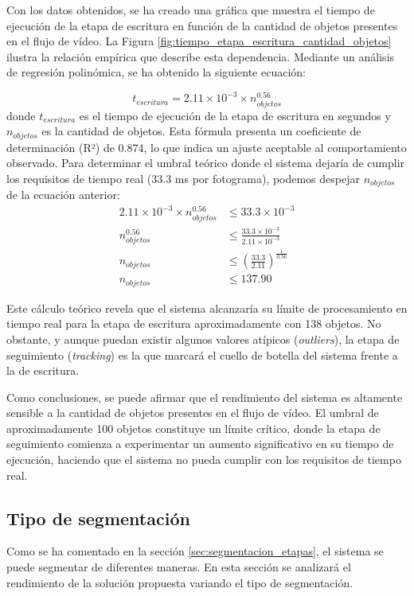 \documentclass[11pt,spanish,listoffigures,listoftables]{tfgetsinf}
\begin{document}
Con los datos obtenidos, se ha creado una gráfica que muestra el tiempo de ejecución de la etapa de escritura en función de la cantidad de objetos presentes en el flujo de vídeo. La Figura \ref{fig:tiempo_etapa_escritura_cantidad_objetos} ilustra la relación empírica que describe esta dependencia. Mediante un análisis de regresión polinómica, se ha obtenido la siguiente ecuación:

\begin{equation}
   t_{escritura} = 2.11 \times 10^{-3} \times n_{objetos}^{0.56}
\end{equation}
donde $t_{escritura}$ es el tiempo de ejecución de la etapa de escritura en segundos y $n_{objetos}$ es la cantidad de objetos. Esta fórmula presenta un coeficiente de determinación (R²) de 0.874, lo que indica un ajuste aceptable al comportamiento observado.
Para determinar el umbral teórico donde el sistema dejaría de cumplir los requisitos de tiempo real (33.3 ms por fotograma), podemos despejar $n_{objetos}$ de la ecuación anterior:
\begin{align}
   2.11 \times 10^{-3} \times n_{objetos}^{0.56} &\leq 33.3 \times 10^{-3} \\
   n_{objetos}^{0.56} &\leq \frac{33.3 \times 10^{-3}}{2.11 \times 10^{-3}} \\
   n_{objetos} &\leq \left(\frac{33.3}{2.11}\right)^{\frac{1}{0.56}} \\
   n_{objetos} &\leq 137.90
\end{align}

Este cálculo teórico revela que el sistema alcanzaría su límite de procesamiento en tiempo real para la etapa de escritura aproximadamente con 138 objetos. No obstante, y aunque puedan existir algunos valores atípicos (\textit{outliers}), la etapa de seguimiento (\textit{tracking}) es la que marcará el cuello de botella del sistema frente a la de escritura.

Como conclusiones, se puede afirmar que el rendimiento del sistema es altamente sensible a la cantidad de objetos presentes en el flujo de vídeo. El umbral de aproximadamente 100 objetos constituye un límite crítico, donde la etapa de seguimiento comienza a experimentar un aumento significativo en su tiempo de ejecución, haciendo que el sistema no pueda cumplir con los requisitos de tiempo real.

\subsection{Tipo de segmentación} \label{sub:analisis_segmentacion}
Como se ha comentado en la sección \ref{sec:segmentacion_etapas}, el sistema se puede segmentar de diferentes maneras. En esta sección se analizará el rendimiento de la solución propuesta variando el tipo de segmentación.
\end{document}
